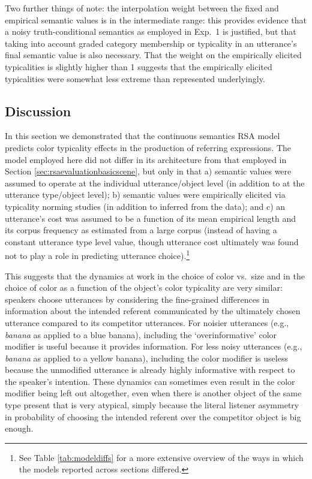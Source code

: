 \documentclass[11pt]{article}
\newcommand{\tableref}[1]{Table \ref{#1}}
\newcommand{\sectionref}[1]{Section \ref{#1}}
\begin{document}
Two further things of note: the interpolation weight between the fixed and empirical semantic values is in the intermediate range: this provides evidence that a noisy truth-conditional semantics as employed in Exp.~1 is justified, but that taking into account graded category membership or typicality in an utterance's final semantic value is also necessary. That the weight on the empirically elicited typicalities is slightly higher than 1 suggests that the empirically elicited typicalities were somewhat less extreme than represented underlyingly.



\subsection{Discussion}

In this section we demonstrated that the continuous semantics RSA model predicts color typicality effects in the production of referring expressions. The model employed here did not differ in its architecture from that employed in \sectionref{sec:rsaevaluationbasicscene}, but only in that a) semantic values were assumed to operate at the individual utterance/object level (in addition to at the utterance type/object level); b) semantic values were empirically elicited via typicality norming studies (in addition to inferred from the data); and c) an utterance's cost was assumed to be a function of its mean empirical length and its corpus frequency as estimated from a large corpus (instead of having a constant utterance type level value, though utterance cost ultimately was found not to play a role in predicting utterance choice).\footnote{See \tableref{tab:modeldiffs} for a more extensive overview of the ways in which the models reported across sections differed.} 

This suggests that the dynamics at work in the choice of color vs.~size and in the choice of color as a function of the object's color typicality are very similar: speakers choose utterances by considering the fine-grained differences in information about the intended referent communicated by the ultimately chosen utterance compared to its competitor utterances. For noisier utterances (e.g., \emph{banana} as applied to a blue banana), including the `overinformative' color modifier is useful because it provides information. For less noisy utterances (e.g., \emph{banana} as applied to a yellow banana), including the color modifier is useless because the unmodified utterance is already highly informative with respect to the speaker's intention. These dynamics can sometimes even result in the color modifier being left out altogether, even when there is another object of the same type present that is very atypical, simply because the literal listener asymmetry in probability of choosing the intended referent over the competitor object is big enough.
\end{document}
